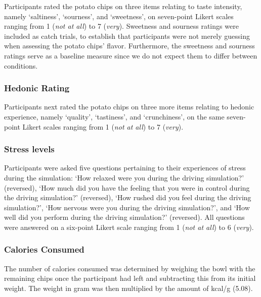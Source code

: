 \documentclass[authordate, empirical, issue]{jote-new-article}
\begin{document}
Participants rated the potato chips on three items relating to taste intensity, namely ‘saltiness’, ‘sourness’, and ‘sweetness’, on seven-point Likert scales ranging from 1 (\emph{not at all}) to 7 (\emph{very}). Sweetness and sourness ratings were included as catch trials, to establish that participants were not merely guessing when assessing the potato chips’ flavor. Furthermore, the sweetness and sourness ratings serve as a baseline measure since we do not expect them to differ between conditions.



\subsubsection{Hedonic Rating }



Participants next rated the potato chips on three more items relating to hedonic experience, namely ‘quality’, ‘tastiness’, and ‘crunchiness’, on the same seven-point Likert scales ranging from 1 (\emph{not at all}) to 7 (\emph{very}).



\subsubsection{Stress levels}



Participants were asked five questions pertaining to their experiences of stress during the simulation: ‘How relaxed were you during the driving simulation?’ (reversed), ‘How much did you have the feeling that you were in control during the driving simulation?’ (reversed), ‘How rushed did you feel during the driving simulation?’, ‘How nervous were you during the driving simulation?’, and ‘How well did you perform during the driving simulation?’ (reversed). All questions were answered on a six-point Likert scale ranging from 1 (\emph{not at all}) to 6 (\emph{very}).



\subsubsection{Calories Consumed }



The number of calories consumed was determined by weighing the bowl with the remaining chips once the participant had left and subtracting this from its initial weight. The weight in gram was then multiplied by the amount of kcal/g (5.08).
\end{document}
